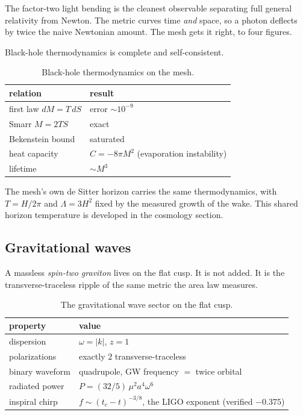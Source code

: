 The factor-two light bending is the cleanest observable separating full general relativity from Newton. The metric curves time \emph{and} space, so a photon deflects by twice the naive Newtonian amount. The mesh gets it right, to four figures.

Black-hole thermodynamics is complete and self-consistent.

\begin{table}[ht]
\centering
\begin{tabular}{@{}ll@{}}
\toprule
relation & result \\
\midrule
first law $dM = T\,dS$ & error $\sim 10^{-9}$ \\
Smarr $M = 2TS$ & exact \\
Bekenstein bound & saturated \\
heat capacity & $C = -8\pi M^2$ (evaporation instability) \\
lifetime & $\sim M^3$ \\
\bottomrule
\end{tabular}
\caption{Black-hole thermodynamics on the mesh.}
\label{tab:bh-thermo}
\end{table}

The mesh's own de Sitter horizon carries the same thermodynamics, with $T = H/2\pi$ and $\Lambda = 3H^2$ fixed by the measured growth of the wake. This shared horizon temperature is developed in the cosmology section.

\subsection{Gravitational waves}

A massless \emph{spin-two graviton} lives on the flat cusp. It is not added. It is the transverse-traceless ripple of the same metric the area law measures.

\begin{table}[ht]
\centering
\begin{tabular}{@{}ll@{}}
\toprule
property & value \\
\midrule
dispersion & $\omega = |k|$, $z = 1$ \\
polarizations & exactly $2$ transverse-traceless \\
binary waveform & quadrupole, GW frequency $=$ twice orbital \\
radiated power & $P = (32/5)\,\mu^2 a^4 \omega^6$ \\
inspiral chirp & $f \sim (t_c - t)^{-3/8}$, the LIGO exponent (verified $-0.375$) \\
\bottomrule
\end{tabular}
\caption{The gravitational wave sector on the flat cusp.}
\label{tab:gw}
\end{table}

